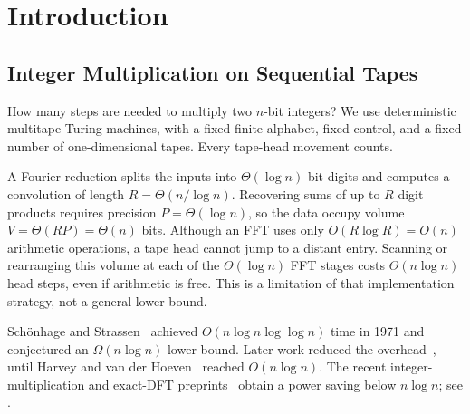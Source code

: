 \documentclass[11pt]{article}
\theoremstyle{definition}
\renewcommand{\label}[1]{}%
\begin{document}
\section{Introduction}\label{sec:intro}
\subsection{Integer Multiplication on Sequential Tapes}\label{sec:history}

How many steps are needed to multiply two $n$-bit integers?
We use deterministic multitape Turing machines, with a fixed finite alphabet, fixed control, and a fixed number of one-dimensional tapes.
Every tape-head movement counts.

A Fourier reduction splits the inputs into $\Theta(\log n)$-bit digits and computes a convolution of length $R=\Theta(n/\log n)$.
Recovering sums of up to $R$ digit products requires precision $P=\Theta(\log n)$, so the data occupy volume $V=\Theta(RP)=\Theta(n)$ bits.
Although an FFT uses only $O(R\log R)=O(n)$ arithmetic operations, a tape head cannot jump to a distant entry.
Scanning or rearranging this volume at each of the $\Theta(\log n)$ FFT stages costs $\Theta(n\log n)$ head steps, even if arithmetic is free.
This is a limitation of that implementation strategy, not a general lower bound.

Sch\"onhage and Strassen~\cite{SS71} achieved $O(n\log n\log\log n)$ time in 1971 and conjectured an $\Omega(n\log n)$ lower bound.
Later work reduced the overhead~\cite{Fur07,Fur09,DKSS13,HvdHL16}, until Harvey and van der Hoeven~\cite{HvdH21} reached $O(n\log n)$.
The recent integer-multiplication and exact-DFT preprints~\cite{OAI26,OAI26b} obtain a power saving below $n\log n$; see .
\end{document}
